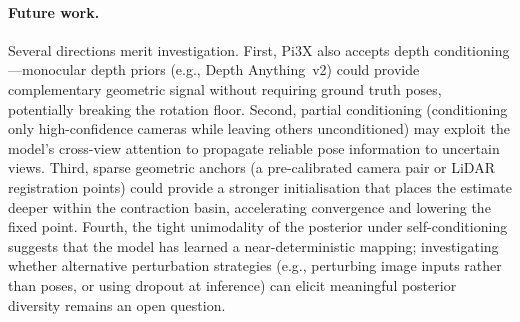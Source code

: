 \paragraph{Future work.} Several directions merit investigation. First, Pi3X also accepts depth conditioning---monocular depth priors (e.g., Depth Anything~v2) could provide complementary geometric signal without requiring ground truth poses, potentially breaking the rotation floor. Second, partial conditioning (conditioning only high-confidence cameras while leaving others unconditioned) may exploit the model's cross-view attention to propagate reliable pose information to uncertain views. Third, sparse geometric anchors (a pre-calibrated camera pair or LiDAR registration points) could provide a stronger initialisation that places the estimate deeper within the contraction basin, accelerating convergence and lowering the fixed point. Fourth, the tight unimodality of the posterior under self-conditioning suggests that the model has learned a near-deterministic mapping; investigating whether alternative perturbation strategies (e.g., perturbing image inputs rather than poses, or using dropout at inference) can elicit meaningful posterior diversity remains an open question.

